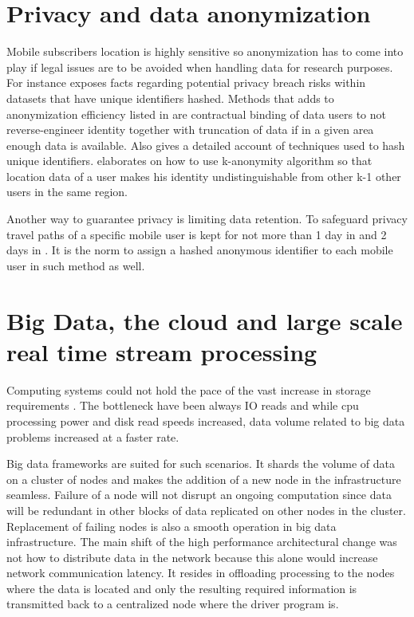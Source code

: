 \documentclass[12pt, a4paper]{report}
\theoremstyle{definition}
\theoremstyle{definition}%
\theoremstyle{definition}%
\theoremstyle{definition}%
\theoremstyle{definition}%
\theoremstyle{definition}%
\begin{document}
\section{Privacy and data anonymization} \label{data_anonymization} 


Mobile subscribers location is highly sensitive so anonymization has to come into play if legal issues are to be avoided when handling data for research purposes. For instance \cite{Laurila2012} exposes facts regarding potential privacy breach risks within datasets that have unique identifiers hashed. Methods that adds to anonymization efficiency listed in \cite{Laurila2012} are contractual binding of data users to not reverse-engineer identity together with truncation of data if in a given area enough data is available. Also \cite{Laurila2012} gives a detailed account of techniques used to hash unique identifiers. \cite{Shin} elaborates on how to use k-anonymity algorithm so that location data of a user makes his identity undistinguishable from other k-1 other users in the same region.

Another way to guarantee privacy is limiting data retention. To safeguard privacy travel paths of a specific mobile user is kept for not more than 1 day in \cite{Hoteit2014} and 2 days in \cite{Calabrese2013}. It is the norm to assign a hashed anonymous identifier to each mobile user in such method as well.


\section{Big Data, the cloud and large scale real time stream processing} \label{background_big_data}

Computing systems could not hold the pace of the vast increase in storage requirements \cite{Liu2014}. The bottleneck have been always IO reads and while cpu processing power and disk read speeds increased, data volume related to big data problems increased at a faster rate. 

Big data frameworks are suited for such scenarios. It shards the volume of data on a cluster of nodes and makes the addition of a new node in the infrastructure seamless. Failure of a node will not disrupt an ongoing computation since data will be redundant in other blocks of data replicated on other nodes in the cluster. Replacement of failing nodes is also a smooth operation in big data infrastructure. The main shift of the high performance architectural change was not how to distribute data in the network because this alone would increase network communication latency. It resides in offloading processing to the nodes where the data is located and only the resulting required information is transmitted back to a centralized node where the driver program is.
\end{document}
